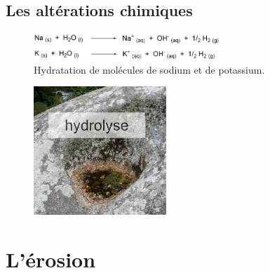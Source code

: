 \documentclass{beamer}
\begin{document}
\subsection{Les altérations chimiques}
\begin{frame}
  \begin{center}
    \begin{figure}
      \includegraphics[width=7cm]{Images/Diapos/Alteration/Chimiques/hydrolyse.png}
      \caption{Hydratation de molécules de sodium et de potassium.}
    \end{figure}
  \end{center}
  \begin{center}
    \begin{figure}
      \includegraphics[width=5cm]{Images/Diapos/Alteration/Chimiques/hydrolyse.jpeg}
    \end{figure}
  \end{center}
\end{frame}

\section{L'érosion}
\end{document}
